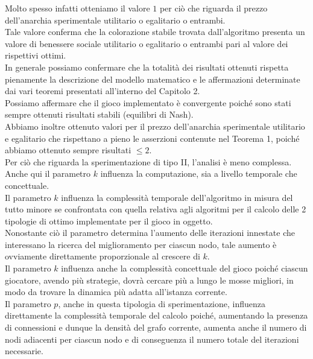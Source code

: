 Molto spesso infatti otteniamo il valore $1$ per ciò che riguarda il prezzo dell'anarchia sperimentale utilitario o egalitario o entrambi.\\
Tale valore conferma che la colorazione stabile trovata dall'algoritmo presenta un valore di benessere sociale utilitario o egalitario o entrambi pari al valore dei rispettivi ottimi.\\

In generale possiamo confermare che la totalità dei risultati ottenuti rispetta pienamente la descrizione del modello matematico e le affermazioni determinate dai vari teoremi presentati all'interno del Capitolo 2.\\
Possiamo affermare che il gioco implementato è convergente poiché sono stati sempre ottenuti risultati stabili (equilibri di Nash).\\
Abbiamo inoltre ottenuto valori per il prezzo dell'anarchia sperimentale utilitario e egalitario che rispettano a pieno le asserzioni contenute nel Teorema 1, poiché abbiamo ottenuto sempre risultati \(\leq 2\).\\

Per ciò che riguarda la sperimentazione di tipo II, l'analisi è meno complessa.\\
Anche qui il parametro $k$ influenza la computazione, sia a livello temporale che concettuale.\\
Il parametro $k$ influenza la complessità temporale dell'algoritmo in misura del tutto minore se confrontata con quella relativa agli algoritmi per il calcolo delle 2 tipologie di ottimo implementate per il gioco in oggetto.\\
Nonostante ciò il parametro determina l'aumento delle iterazioni innestate che interessano la ricerca del miglioramento per ciascun nodo, tale aumento è ovviamente direttamente proporzionale al crescere di $k$.\\

Il parametro $k$ influenza anche la complessità concettuale del gioco poiché ciascun giocatore, avendo più strategie, dovrà cercare più a lungo le mosse migliori, in modo da trovare la dinamica più adatta all'istanza corrente.\\

Il parametro $p$, anche in questa tipologia di sperimentazione, influenza direttamente la complessità temporale del calcolo poiché, aumentando la presenza di connessioni e dunque la densità del grafo corrente, aumenta anche il numero di nodi adiacenti per ciascun nodo e di conseguenza il numero totale del iterazioni necessarie.\\

